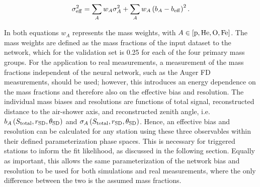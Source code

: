 \begin{equation}
  \sigma_{\rm eff}^{2} = \sum_{A} w_{A} \sigma_{A}^{2} + \sum_{A} w_{A}\left(b_{A} - b_{\rm eff}\right)^{2}. \label{eq:effective_resolution}
\end{equation}

\noindent
In both equations $w_{A}$ represents the mass weights, with $A\in\left[\rm p, He, O, Fe\right]$.
The mass weights are defined as the mass fractions of the input dataset to the network, which for the validation set is 0.25 for each of the four primary mass groups.
For the application to real measurements, a measurement of the mass fractions independent of the neural network, such as the Auger FD measurements, should be used; however, this introduces an energy dependence on the mass fractions and therefore also on the effective bias and resolution.
The individual mass biases and resolutions are functions of total signal, reconstructed distance to the air-shower axis, and reconstructed zenith angle, i.e. $b_{A}\left(S_{\rm total}, r_{\rm SD}, \theta_{\rm SD}\right)$ and $\sigma_{A}\left(S_{\rm total}, r_{\rm SD}, \theta_{\rm SD}\right)$.
Hence, an effective bias and resolution can be calculated for any station using these three observables within their defined parameterization phase spaces.
This is necessary for triggered stations to inform the fit likelihood, as discussed in the following section. 
Equally as important, this allows the same parameterization of the network bias and resolution to be used for both simulations and real measurements, where the only difference between the two is the assumed mass fractions.








